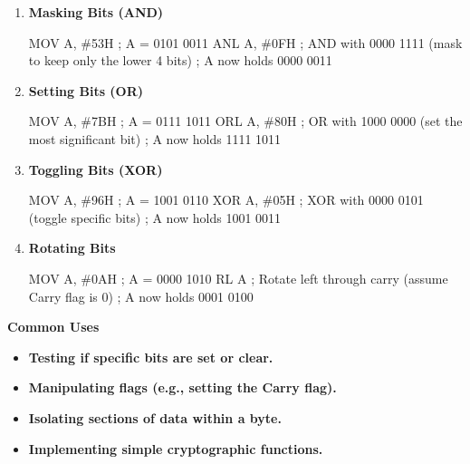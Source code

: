 \documentclass[
]{article}
\newenvironment{Shaded}{}{}
\newcommand{\NormalTok}[1]{#1}
\begin{document}
\begin{enumerate}
\def\labelenumi{\arabic{enumi}.}
\item
  \textbf{Masking Bits (AND)}

\begin{Shaded}
\begin{Highlighting}[]
\NormalTok{MOV A, \#53H  ; A = 0101 0011}
\NormalTok{ANL A, \#0FH  ; AND with 0000 1111 (mask to keep only the lower 4 bits)}
\NormalTok{; A now holds 0000 0011}
\end{Highlighting}
\end{Shaded}
\item
  \textbf{Setting Bits (OR)}

\begin{Shaded}
\begin{Highlighting}[]
\NormalTok{MOV A, \#7BH  ; A = 0111 1011}
\NormalTok{ORL A, \#80H  ; OR with 1000 0000 (set the most significant bit)}
\NormalTok{; A now holds 1111 1011}
\end{Highlighting}
\end{Shaded}
\item
  \textbf{Toggling Bits (XOR)}

\begin{Shaded}
\begin{Highlighting}[]
\NormalTok{MOV A, \#96H  ; A = 1001 0110}
\NormalTok{XOR A, \#05H  ; XOR with 0000 0101 (toggle specific bits)}
\NormalTok{; A now holds 1001 0011}
\end{Highlighting}
\end{Shaded}
\item
  \textbf{Rotating Bits}

\begin{Shaded}
\begin{Highlighting}[]
\NormalTok{MOV A, \#0AH  ; A = 0000 1010}
\NormalTok{RL A         ; Rotate left through carry (assume Carry flag is 0)}
\NormalTok{; A now holds 0001 0100}
\end{Highlighting}
\end{Shaded}
\end{enumerate}

\textbf{Common Uses}

\begin{itemize}
\item
  \textbf{Testing if specific bits are set or clear.}
\item
  \textbf{Manipulating flags (e.g., setting the Carry flag).}
\item
  \textbf{Isolating sections of data within a byte.}
\item
  \textbf{Implementing simple cryptographic functions.}
\end{itemize}
\end{document}
